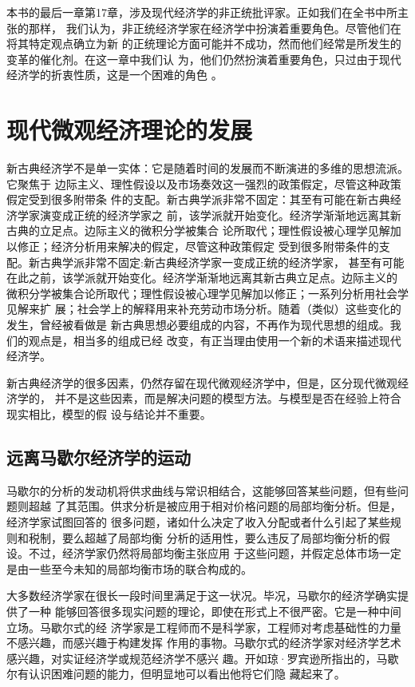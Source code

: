 本书的最后一章第17章，涉及现代经济学的非正统批评家。正如我们在全书中所主张的那样，
我们认为，非正统经济学家在经济学中扮演着重要角色。尽管他们在将其特定观点确立为新
的正统理论方面可能并不成功，然而他们经常是所发生的变革的催化剂。在这一章中我们认
为，他们仍然扮演着重要角色，只过由于现代经济学的折衷性质，这是一个困难的角色 。

\chapter{现代微观经济理论的发展}

新古典经济学不是单一实体：它是随着时间的发展而不断演进的多维的思想流派。它聚焦于
边际主义、理性假设以及市场奏效这一强烈的政策假定，尽管这种政策假定受到很多附带条
件的支配。新古典学派非常不固定：其至有可能在新古典经济学家演变成正统的经济学家之
前，该学派就开始变化。经济学渐渐地远离其新古典的立足点。边际主义的微积分学被集合
论所取代；理性假设被心理学见解加以修正；经济分析用来解决的假定，尽管这种政策假定
受到很多附带条件的支配。新古典学派非常不固定:新古典经济学家一变成正统的经济学家，
甚至有可能在此之前，该学派就开始变化。经济学渐渐地远离其新古典立足点。边际主义的
微积分学被集合论所取代；理性假设被心理学见解加以修正；一系列分析用社会学见解来扩
展；社会学上的解释用来补充劳动市场分析。随着（类似）这些变化的发生，曾经被看做是
新古典思想必要组成的内容，不再作为现代思想的组成。我们的观点是，相当多的组成已经
改变，有正当理由使用一个新的术语来描述现代经济学。

新古典经济学的很多因素，仍然存留在现代微观经济学中，但是，区分现代微观经济学的，
并不是这些因素，而是解决问题的模型方法。与模型是否在经验上符合现实相比，模型的假
设与结论并不重要。

\section{远离马歇尔经济学的运动}

马歇尔的分析的发动机将供求曲线与常识相结合，这能够回答某些问题，但有些问题则超越
了其范围。供求分析是被应用于相对价格问题的局部均衡分析。但是，经济学家试图回答的
很多问题，诸如什么决定了收入分配或者什么引起了某些规则和税制，要么超越了局部均衡
分析的适用性，要么违反了局部均衡分析的假设。不过，经济学家仍然将局部均衡主张应用
于这些问题，并假定总体市场一定是由一些至今未知的局部均衡市场的联合构成的。

大多数经济学家在很长一段时间里满足于这一状况。毕况，马歇尔的经济学确实提供了一种
能够回答很多现实问题的理论，即使在形式上不很严密。它是一种中间立场。马歇尔式的经
济学家是工程师而不是科学家，工程师对考虑基础性的力量不感兴趣，而感兴趣于构建发挥
作用的事物。马歇尔式的经济学家对经济学艺术感兴趣，对实证经济学或规范经济学不感兴
趣。开如琼·罗宾逊所指出的，马歇尔有认识困难问题的能力，但明显地可以看出他将它们隐
藏起来了。

